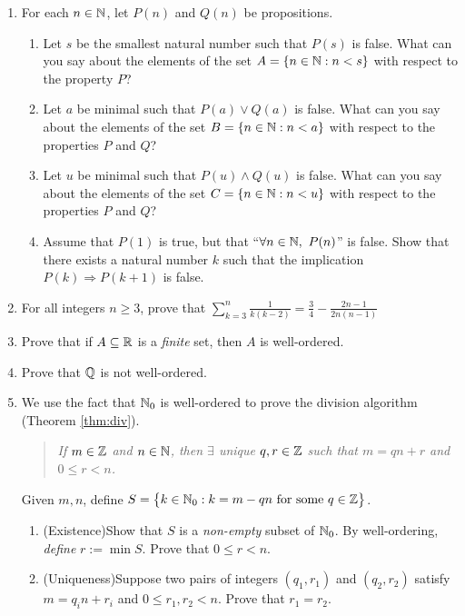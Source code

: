 \begin{exercises}
\begin{enumerate}
		\item For each $n\in\mathbb{N}$, let $P(n)$ and $Q(n)$ be propositions.
		\begin{enumerate}
			\item Let $s$ be the smallest natural number such that $P(s)$ is false. What can you say about the elements of the set $A=\{n\in\mathbb{N}:n<s\}$ with respect to the property $P$?
			\item Let $a$ be minimal such that $P(a)\vee Q(a)$ is false. What can you say about the elements of the set $B=\{n\in\mathbb{N}:n<a\}$ with respect to the properties $P$ and $Q$?
			\item Let $u$ be minimal such that $P(u)\wedge Q(u)$ is false. What can you say about the elements of the set $C=\{n\in\mathbb{N}:n<u\}$ with respect to the properties $P$ and $Q$?
			\item Assume that $P(1)$ is true, but that ``$\forall n\in\N,\ P(n)$'' is false. Show that there exists a natural number $k$ such that the implication $P(k)\Longrightarrow P(k+1)$ is false.
		\end{enumerate}
	
		
		
		\item For all integers $n\ge 3$, prove that $\sum\limits_{k=3}^n\frac 1{k(k-2)} =\frac 34-\frac{2n-1}{2n(n-1)}$	
	
	
		\item Prove that if $A\subseteq\mathbb{R}$ is a \emph{finite} set, then $A$ is well-ordered.
	
	
		\item Prove that $\mathbb{Q}$ is not well-ordered.
  
	
		\item We use the fact that $\mathbb{N}_0$ is well-ordered to prove the division algorithm (Theorem \ref{thm:div}).
		\begin{quote}
			\emph{If $m\in\mathbb{Z}$ and $n\in\mathbb{N}$, then $\exists$ unique $q,r\in\mathbb{Z}$ such that $m=qn+r$ and $0\le r<n$.}
		\end{quote}
	
		Given $m,n$, define $S=\bigl\{k\in\mathbb{N}_0:k=m-qn\text{ for some }q\in\mathbb{Z}\bigr\}$.	
		\begin{enumerate}
			\item (Existence)\lstsp Show that $S$ is a \emph{non-empty} subset of $\mathbb{N}_0$. By well-ordering, \emph{define} $r:=\min S$. Prove that $0\le r<n$.
			\item (Uniqueness)\lstsp Suppose two pairs of integers $(q_1,r_1)$ and $(q_2,r_2)$ satisfy $m=q_in+r_i$ and $0\le r_1,r_2<n$. Prove that $r_1=r_2$.
		\end{enumerate}
		

\end{enumerate}
\end{exercises}
